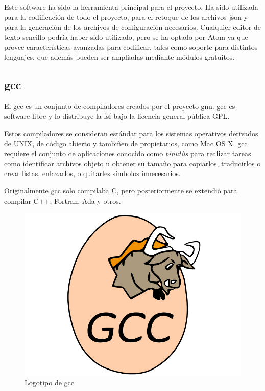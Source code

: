		\FloatBarrier

		Este software ha sido la herramienta principal para el proyecto. Ha sido utilizada para la codificación de todo el proyecto, para el retoque de los archivos \acrshort{json} y para la generación de los archivos de configuración necesarios. Cualquier editor de texto sencillo podría haber sido utilizado, pero se ha optado por Atom ya que provee características avanzadas para codificar, tales como soporte para distintos lenguajes, que además pueden ser ampliadas mediante módulos gratuitos.

	\subsection{\acrlong{gcc}}

		El \acrfull{gcc} es un conjunto de compiladores creados por el proyecto \acrshort{gnu}. \acrshort{gcc} es software libre y lo distribuye la \acrshort{fsf} bajo la licencia general pública GPL.

		Estos compiladores se consideran estándar para los sistemas operativos derivados de UNIX, de código abierto y tambiñen de propietarios, como Mac OS X. \acrshort{gcc} requiere el conjunto de aplicaciones conocido como \textit{binutils} para realizar tareas como identificar archivos objeto u obtener su tamaño para copiarlos, traducirlos o crear listas, enlazarlos, o quitarles símbolos innecesarios.

		Originalmente \acrshort{gcc} solo compilaba C, pero posteriormente se extendió para compilar C++, Fortran, Ada y otros.

		\begin{figure}[!htp]
			 \centering
			 \includegraphics[scale=.25]{fig/gcc}
			 \caption{Logotipo de \acrshort{gcc}}
			 \label{fig:gcc}
		\end{figure}


